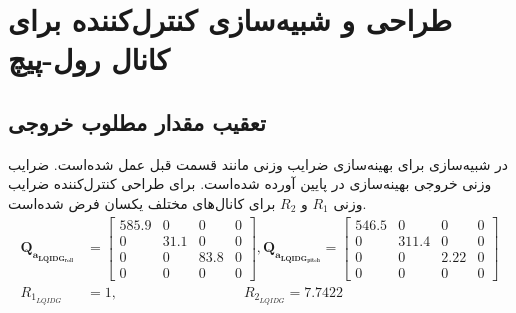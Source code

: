 \section{طراحی و شبیه‌سازی کنترل‌کننده برای کانال رول-پیچ}
\subsection{تعقیب مقدار مطلوب خروجی}\label{roll_pitch_regulator}

 در شبیه‌سازی برای بهینه‌سازی ضرایب وزنی مانند قسمت قبل عمل شده‌است.
 ضرایب وزنی خروجی بهینه‌سازی در پایین آورده شده‌است. برای طراحی کنترل‌کننده
ضرایب وزنی
$R_1$
و
$R_2$
برای کانال‌های مختلف یکسان فرض شده‌است.
\begin{equation}
	\begin{split}
		\boldsymbol{Q_{a_{LQIDG_{roll}}}} &= \begin{bmatrix}
			585.9 &0& 0& 0\\
			0 &  31.1 & 0 &0 \\
			0 & 0 & 83.8 & 0\\
			0 & 0 & 0 & 0
		\end{bmatrix} ,
	\boldsymbol{Q_{a_{LQIDG_{pitch}}}} = \begin{bmatrix}
		546.5 &0& 0& 0\\
		0 &  311.4 & 0 &0 \\
		0 & 0 & 2.22 & 0\\
		0 & 0 & 0 & 0
		\end{bmatrix}\\
	R_{1_{LQIDG}} &=  1,\qquad  \qquad \qquad \qquad \quad R_{2_{LQIDG}} =  7.7422
	\end{split}
\end{equation}

